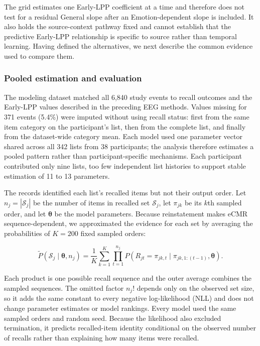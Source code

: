 \documentclass[
  man,
  longtable,
  nolmodern,
  notxfonts,
  notimes,
  draftfirst,
  colorlinks=true,linkcolor=blue,citecolor=blue,urlcolor=blue]{apa7}
\begin{document}
The grid estimates one Early-LPP coefficient at a time and therefore
does not test for a residual General slope after an Emotion-dependent
slope is included. It also holds the source-context pathway fixed and
cannot establish that the predictive Early-LPP relationship is specific
to source rather than temporal learning. Having defined the
alternatives, we next describe the common evidence used to compare them.

\subsubsection{Pooled estimation and
evaluation}\label{pooled-estimation-and-evaluation}

The modeling dataset matched all 6,840 study events to recall outcomes
and the Early-LPP values described in the preceding EEG methods. Values
missing for 371 events (5.4\%) were imputed without using recall status:
first from the same item category on the participant's list, then from
the complete list, and finally from the dataset-wide category mean. Each
model used one parameter vector shared across all 342 lists from 38
participants; the analysis therefore estimates a pooled pattern rather
than participant-specific mechanisms. Each participant contributed only
nine lists, too few independent list histories to support stable
estimation of 11 to 13 parameters.

The records identified each list's recalled items but not their output
order. Let \(n_j=|\mathcal S_j|\) be the number of items in recalled set
\(\mathcal S_j\), let \(\pi_{jk}\) be its \(k\)th sampled order, and let
\(\boldsymbol\theta\) be the model parameters. Because reinstatement
makes eCMR sequence-dependent, we approximated the evidence for each set
by averaging the probabilities of \(K=200\) fixed sampled orders:

\[
\widetilde P(\mathcal S_j\mid\boldsymbol\theta,n_j)
=
\frac{1}{K}
\sum_{k=1}^{K}
\prod_{t=1}^{n_j}
P\!\left(
R_{jt}=\pi_{jk,t}
\mid
\pi_{jk,1:(t-1)},
\boldsymbol\theta
\right).
\]

Each product is one possible recall sequence and the outer average
combines the sampled sequences. The omitted factor \(n_j!\) depends only
on the observed set size, so it adds the same constant to every negative
log-likelihood (NLL) and does not change parameter estimates or model
rankings. Every model used the same sampled orders and random seed.
Because the likelihood also excluded termination, it predicts
recalled-item identity conditional on the observed number of recalls
rather than explaining how many items were recalled.
\end{document}
